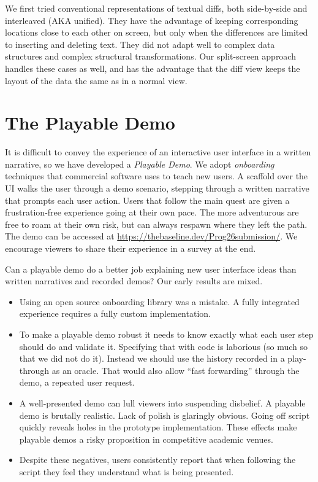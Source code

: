 \documentclass[english,submission]{programming}
\theoremstyle{definition}
\begin{document}
We first tried conventional representations of textual diffs, both side-by-side and interleaved (AKA unified). They have the advantage of keeping corresponding locations close to each other on screen, but only when the differences are limited to inserting and deleting text. They did not adapt well to complex data structures and complex structural transformations. Our split-screen approach handles these cases as well, and has the advantage that the diff view keeps the layout of the data the same as in a normal view.



\section{The Playable Demo}\label{demo}

It is difficult to convey the experience of an interactive user interface in a written narrative, so we have developed a \textit{Playable Demo}. We adopt \textit{onboarding} techniques that commercial software uses to teach new users. A scaffold over the UI walks the user through a demo scenario, stepping through a written narrative that prompts each user action. Users that follow the main quest are given a frustration-free experience going at their own pace. The more adventurous are free to roam at their own risk, but can always respawn where they left the path. The demo can be accessed at \url{https://thebaseline.dev/Prog26submission/}. We encourage viewers to share their experience in a survey at the end.

Can a playable demo do a better job explaining new user interface ideas than
written narratives and recorded demos? Our early results are mixed.

\begin{itemize}
\item Using an open source onboarding library was a mistake. A fully integrated experience requires a fully custom implementation.
\item To make a playable demo robust it needs to know exactly what each user step should do and validate it. Specifying that with code is laborious (so much so that we did not do it). Instead we should use the history recorded in a play-through as an oracle. That would also allow ``fast forwarding'' through the demo, a repeated user request.
\item A well-presented demo can lull viewers into suspending disbelief. A playable demo is brutally realistic. Lack of polish is glaringly obvious. Going off script quickly reveals holes in the prototype implementation. These effects make playable demos a risky proposition in competitive academic venues.
\item Despite these negatives, users consistently report that when following the script they feel they understand what is being presented.

\end{itemize}
\end{document}
